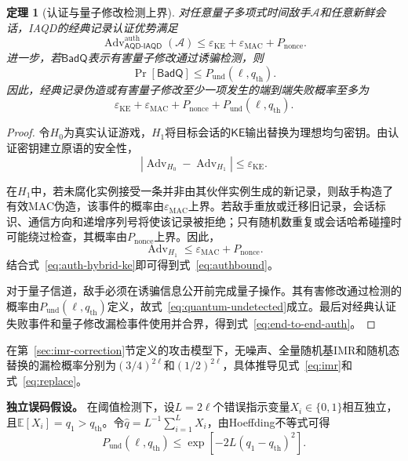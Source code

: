 \documentclass[UTF8,10pt,a4paper]{ctexart}
\theoremstyle{aqdplain}
\newtheorem{theorem}{定理}
\newcommand{\Adv}{\operatorname{Adv}}
\newcommand{\Prb}{\Pr}
\newcommand{\prot}{\mathsf{AQD\mbox{-}IAQD}}
\begin{document}
\begin{theorem}[认证与量子修改检测上界]
对任意量子多项式时间敌手$\mathcal A$和任意新鲜会话，IAQD的经典记录认证优势满足
\begin{equation}
\Adv_{\prot}^{\mathrm{auth}}(\mathcal A)
\leq
\varepsilon_{\mathrm{KE}}
+\varepsilon_{\mathrm{MAC}}
+P_{\mathrm{nonce}}.
\label{eq:authbound}
\end{equation}
进一步，若$\mathsf{BadQ}$表示有害量子修改通过诱骗检测，则
\begin{equation}
\Prb[\mathsf{BadQ}]
\leq
P_{\mathrm{und}}(\ell,q_{\mathrm{th}}).
\label{eq:quantum-undetected}
\end{equation}
因此，经典记录伪造或有害量子修改至少一项发生的端到端失败概率至多为
\begin{equation}
\varepsilon_{\mathrm{KE}}
+\varepsilon_{\mathrm{MAC}}
+P_{\mathrm{nonce}}
+P_{\mathrm{und}}(\ell,q_{\mathrm{th}}).
\label{eq:end-to-end-auth}
\end{equation}
\end{theorem}

\begin{proof}
令$H_0$为真实认证游戏，$H_1$将目标会话的$\mathsf{KE}$输出替换为理想均匀密钥。由认证密钥建立原语的安全性，
\begin{equation}
\left|
\Adv_{H_0}-\Adv_{H_1}
\right|
\leq
\varepsilon_{\mathrm{KE}}.
\label{eq:auth-hybrid-ke}
\end{equation}

在$H_1$中，若未腐化实例接受一条并非由其伙伴实例生成的新记录，则敌手构造了有效MAC伪造，该事件的概率由$\varepsilon_{\mathrm{MAC}}$上界。若敌手重放或迁移旧记录，会话标识、通信方向和递增序列号将使该记录被拒绝；只有随机数重复或会话哈希碰撞时可能绕过检查，其概率由$P_{\mathrm{nonce}}$上界。因此，
\[
\Adv_{H_1}
\leq
\varepsilon_{\mathrm{MAC}}+P_{\mathrm{nonce}}.
\]
结合式~\eqref{eq:auth-hybrid-ke}即可得到式~\eqref{eq:authbound}。

对于量子信道，敌手必须在诱骗信息公开前完成量子操作。其有害修改通过检测的概率由$P_{\mathrm{und}}(\ell,q_{\mathrm{th}})$定义，故式~\eqref{eq:quantum-undetected}成立。最后对经典认证失败事件和量子修改漏检事件使用并合界，得到式~\eqref{eq:end-to-end-auth}。
\end{proof}

在第~\ref{sec:imr-correction}节定义的攻击模型下，无噪声、全量随机基IMR和随机态替换的漏检概率分别为$(3/4)^{2\ell}$和$(1/2)^{2\ell}$，具体推导见式~\eqref{eq:imr}和式~\eqref{eq:replace}。

\textbf{独立误码假设。}
在阈值检测下，设$L=2\ell$个错误指示变量$X_i\in\{0,1\}$相互独立，且$\mathbb E[X_i]=q_1>q_{\mathrm{th}}$。令$\widehat q=L^{-1}\sum_{i=1}^{L}X_i$，由Hoeffding不等式\citep{hoeffding1963}可得
\begin{equation}
P_{\mathrm{und}}(\ell,q_{\mathrm{th}})
\leq
\exp\!\left[-2L(q_1-q_{\mathrm{th}})^2\right].
\label{eq:hoeffding}
\end{equation}
\end{document}
